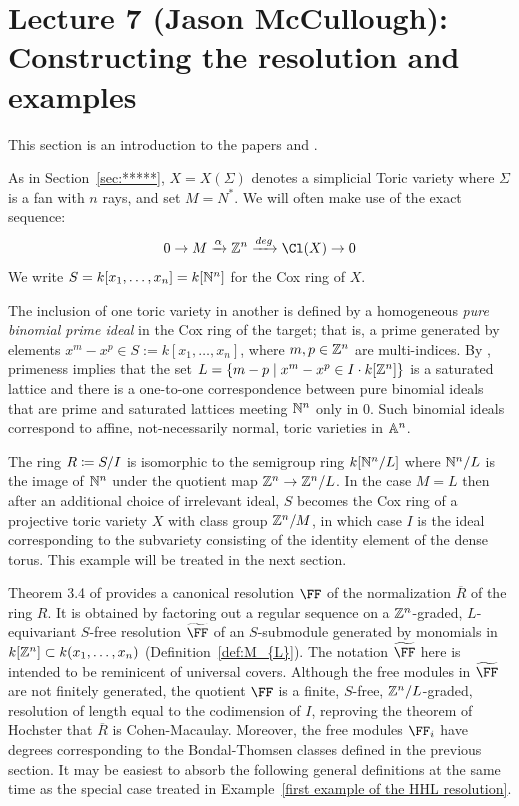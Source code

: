 \documentclass{amsart}
\begin{document}
\fi
\def\tF{{\widetilde \FF}}
\def\BT{{Bondal-Thomsen\ }}

\section{Lecture 7 (Jason McCullough): Constructing the resolution and examples}\label{lec:7-HHL-construction}
This section is an introduction to the papers \cite{BCS+25} and \cite{BH25}.

As in Section~\ref{sec:*****}, $X = X(\Sigma)$ denotes a simplicial Toric variety where $\Sigma$ is a fan with $n$ rays, and set $M = N^{*}$. We will often make use of the exact sequence:
$$
0\to M \xrightarrow {\alpha} \ZZ^{n} \xrightarrow {deg} \Cl(X) \to 0
$$
We write $S = k[x_{1},\dots,x_{n}]= k[\NN^{n}]$ for the Cox ring of $X$.


The inclusion of one toric variety in another is defined by a 
homogeneous \emph{pure binomial prime ideal}
in the Cox ring of the target; that is, a prime generated by elements $x^m-x^p \in S := k[x_1,\dots, x_n]$, where $m,p\in\ZZ^n$ are multi-indices. By \cite{ES96}, primeness implies that
the set $L = \{m-p\mid x^m-x^p\in I \cdot k[\ZZ^n]\}$ is a saturated lattice and there is a one-to-one correspondence between pure binomial ideals that are prime and saturated lattices meeting
 $\NN^n$ only in 0. Such binomial ideals correspond to affine, not-necessarily normal, toric varieties in $\AA^{n}$. 
 
 The ring $R \ce S/I$ is isomorphic to the semigroup ring $k[\NN^n/L]$ where $\NN^n/L$ is the image of $\NN^n$ under the quotient map $\ZZ^n\rightarrow \ZZ^n/L$.
 In the case $M = L$ then after an additional choice of irrelevant ideal, $S$ becomes the Cox ring of a projective toric variety $X$ with class group $\ZZ^n/M$, in which case $I$ is the ideal corresponding to the subvariety consisting of the identity element of the dense torus. This example will be treated in the next section.


Theorem 3.4 of \cite{BCS+25} provides a canonical  resolution $\FF$ of the normalization $\overline R$
of the ring $R$. It is obtained by factoring out a regular sequence on a $\ZZ^{n}$-graded, $L$-equivariant $S$-free resolution $\tF$
of an $S$-submodule generated by monomials in $k[\ZZ^n] \subset k(x_{1}, \dots, x_{n})$ (Definition~\ref{def:M_{L}}).
The notation $\tF$ here is intended to be reminicent of universal covers.
Although the free modules in $\tF$ are not finitely generated, the quotient $\FF$
is a finite, $S$-free, $\ZZ^{n}/L$-graded, resolution of length equal to the 
codimension of $I$, reproving the theorem of Hochster that
$\overline R$ is Cohen-Macaulay. Moreover, the free modules $\FF_{i}$ have degrees
corresponding to the Bondal-Thomsen classes defined in the previous section. It may be easiest to
absorb the following general definitions at the same time as the special case treated in Example~\ref{first example of the HHL resolution}.
\end{document}
